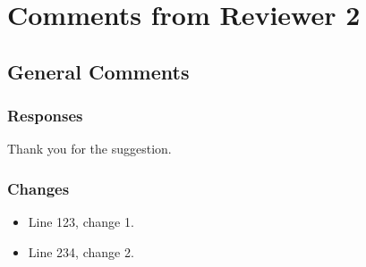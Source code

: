 \documentclass{RebuttalLetter}
\begin{document}
\newpage
\section{Comments from Reviewer 2}

\subsection{General Comments}
\begin{commentbox}
    \lipsum[6]

    \lipsum[7]
\end{commentbox}

\subsubsection*{Responses}
Thank you for the suggestion.

\subsubsection*{Changes}
\begin{itemize}
    \item Line 123, change 1.
    \item Line 234, change 2.
\end{itemize}


\newpage
\printbibliography
{}
\end{document}
